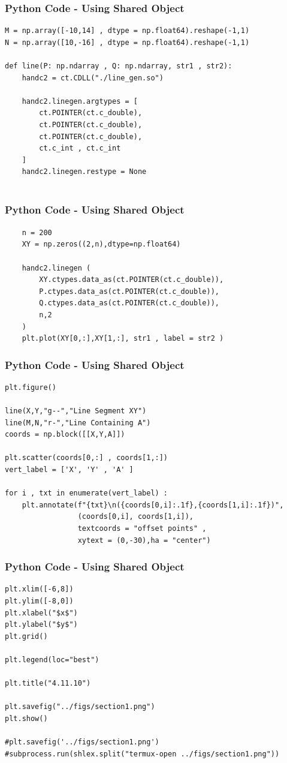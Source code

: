\documentclass{beamer}
\begin{document}
\begin{frame}[fragile]
    \frametitle{Python Code - Using Shared Object}
    \begin{lstlisting}
M = np.array([-10,14] , dtype = np.float64).reshape(-1,1)
N = np.array([10,-16] , dtype = np.float64).reshape(-1,1)

def line(P: np.ndarray , Q: np.ndarray, str1 , str2):
    handc2 = ct.CDLL("./line_gen.so")

    handc2.linegen.argtypes = [
        ct.POINTER(ct.c_double),
        ct.POINTER(ct.c_double),
        ct.POINTER(ct.c_double),
        ct.c_int , ct.c_int
    ]
    handc2.linegen.restype = None
    
\end{lstlisting}
\end{frame}
\begin{frame}[fragile]
    \frametitle{Python Code - Using Shared Object}
    \begin{lstlisting}
    n = 200
    XY = np.zeros((2,n),dtype=np.float64)

    handc2.linegen (
        XY.ctypes.data_as(ct.POINTER(ct.c_double)),
        P.ctypes.data_as(ct.POINTER(ct.c_double)),
        Q.ctypes.data_as(ct.POINTER(ct.c_double)),
        n,2
    )
    plt.plot(XY[0,:],XY[1,:], str1 , label = str2 )
    \end{lstlisting}
\end{frame}

\begin{frame}[fragile]
    \frametitle{Python Code - Using Shared Object}
    \begin{lstlisting}
plt.figure()

line(X,Y,"g--","Line Segment XY")
line(M,N,"r-","Line Containing A")
coords = np.block([[X,Y,A]])

plt.scatter(coords[0,:] , coords[1,:])
vert_label = ['X', 'Y' , 'A' ]

for i , txt in enumerate(vert_label) :
    plt.annotate(f"{txt}\n({coords[0,i]:.1f},{coords[1,i]:.1f})",
                 (coords[0,i], coords[1,i]),
                 textcoords = "offset points" ,
                 xytext = (0,-30),ha = "center")
\end{lstlisting}
\end{frame}

\begin{frame}[fragile]
    \frametitle{Python Code - Using Shared Object}
    \begin{lstlisting}
plt.xlim([-6,8])
plt.ylim([-8,0])
plt.xlabel("$x$")
plt.ylabel("$y$")
plt.grid()

plt.legend(loc="best")

plt.title("4.11.10")

plt.savefig("../figs/section1.png")
plt.show()

#plt.savefig('../figs/section1.png')
#subprocess.run(shlex.split("termux-open ../figs/section1.png"))

\end{lstlisting}
\end{frame}
\end{document}
